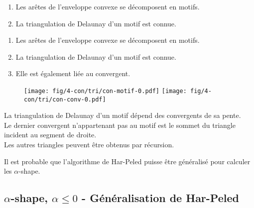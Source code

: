 \begin{frame}
{
  \begin{block}{}
	  \begin{enumerate}
		\item Les arêtes de l'enveloppe convexe se décomposent en motifs.
		\item La triangulation de Delaunay d'un motif est connue.
	  \end{enumerate}
  \end{block}

}
{
  \begin{block}{}
	  \begin{enumerate}
		\item Les arêtes de l'enveloppe convexe se décomposent en motifs.
		\item La triangulation de Delaunay d'un motif est connue.
		\item Elle est également liée au convergent.
	  \end{enumerate}
  \end{block}
}
{
	\begin{figure}[H]
	  \centering
	  \texttt{[image: fig/4-con/tri/con-motif-0.pdf]}
	  \texttt{[image: fig/4-con/tri/con-conv-0.pdf]}
	\end{figure}
}
{
  \begin{block}{}
    La triangulation de Delaunay d'un motif dépend des convergents de sa pente.\\
	  Le dernier convergent n'appartenant pas au motif est le sommet du triangle incident au segment de droite.\\
	  Les autres triangles peuvent être obtenus par récursion.\\
  \end{block}
}



{
	\begin{alertblock}{}
	  Il est probable que l'algorithme de Har-Peled puisse être généralisé pour calculer les $\alpha$-shape.
	\end{alertblock}
}
\end{frame}


\subsection{$\alpha$-shape, $\alpha \leq 0$ - Généralisation de Har-Peled}

